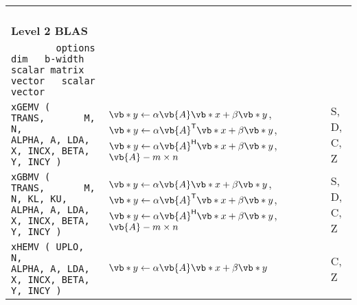 \documentclass[10pt,a3paper, landscape]{article}
\newcommand{\T}{\mathsf{T}}
\renewcommand{\H}{\mathsf{H}}
\begin{document}
\begin{tabular}{lll}
		\verb|                                                                                         |                                                                    &                                                                                                                                                                                                                                                              &                    \\
		\multicolumn{3}{l}{\Large{\textbf{Level 2 BLAS}}}                                                                                                                                                                                                                                                                                                                                                                                                       \\
		\verb|        options            dim   b-width scalar matrix  vector   scalar vector           |                                                                    &                                                                                                                                                                                                                                                              &                    \\
		\verb|xGEMV (       TRANS,       M, N,         ALPHA, A, LDA, X, INCX, BETA,  Y, INCY )        |                                                                    & $\vb*{y} \gets \alpha \vb{A} \vb*{x} + \beta \vb*{y}$, $\vb*{y} \gets \alpha \vb{A}^{\T} \vb*{x} + \beta \vb*{y}$, $\vb*{y} \gets \alpha \vb{A}^{\H} \vb*{x} + \beta \vb*{y}$, $\vb{A} - m\times n$                                                          & S, D, C, Z         \\
		\verb|xGBMV (       TRANS,       M, N, KL, KU, ALPHA, A, LDA, X, INCX, BETA,  Y, INCY )        |                                                                    & $\vb*{y} \gets \alpha \vb{A} \vb*{x} + \beta \vb*{y}$, $\vb*{y} \gets \alpha \vb{A}^{\T} \vb*{x} + \beta \vb*{y}$, $\vb*{y} \gets \alpha \vb{A}^{\H} \vb*{x} + \beta \vb*{y}$, $\vb{A} - m\times n$                                                          & S, D, C, Z         \\
		\verb|xHEMV ( UPLO,                 N,         ALPHA, A, LDA, X, INCX, BETA,  Y, INCY )        |                                                                    & $\vb*{y} \gets \alpha \vb{A} \vb*{x} + \beta \vb*{y}$                                                                                                                                                                                                        & C, Z               \\

\end{tabular}
\end{document}
